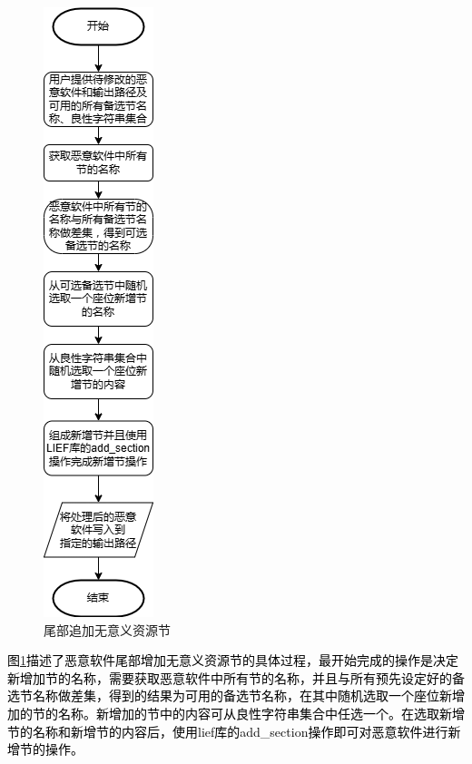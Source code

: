\begin{figure}[htbp]
  \centering
  \includegraphics[scale=0.8]{images/append_benign_sections.png}
  \caption{尾部追加无意义资源节}\label{fig:append_benign_sections}
\end{figure}
\textcolor{black}{图\ref{fig:append_benign_sections}描述了恶意软件尾部增加无意义资源节的具体过程，最开始完成的操作是决定新增加节的名称，需要获取恶意软件中所有节的名称，并且与所有预先设定好的备选节名称做差集，得到的结果为可用的备选节名称，在其中随机选取一个座位新增加的节的名称。新增加的节中的内容可从良性字符串集合中任选一个。在选取新增节的名称和新增节的内容后，使用lief库的add\_section操作即可对恶意软件进行新增节的操作。}

